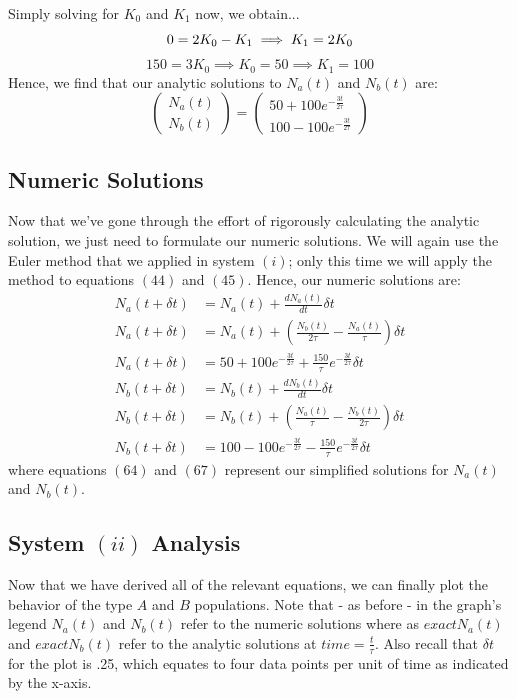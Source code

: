 \documentclass[twocolumn]{article}
\begin{document}
Simply solving for $K_0$ and $K_1$ now, we obtain...
	\begin{equation}
	0=2K_0-K_1 \implies K_1=2K_0\\
	\end{equation}
	\begin{equation}
	150=3K_0 \implies K_0=50 \implies K_1=100
	\end{equation}
Hence, we find that our analytic solutions to $N_a(t)$ and $N_b(t)$ are:
	\begin{equation}
	\left(\begin{array}{c} N_a(t)\\ N_b(t)\end{array}\right) = \left(\begin{array}{c} 50+100e^{-\frac{3t}{2\tau}}\\ 100-100e^{-\frac{3t}{2\tau}}\end{array}\right)
	\end{equation}
\subsection{Numeric Solutions}
\hspace{\parindent} Now that we've gone through the effort of rigorously calculating the analytic solution, we just need to formulate our numeric solutions. We will again use the Euler method that we applied in system $(i)$; only this time we will apply the method to equations $(44)$ and $(45)$. Hence, our numeric solutions are:
	\begin{align}
	N_a(t+\delta t)&=N_a(t)+\frac{dN_a(t)}{dt}\delta t\\
	N_a(t+\delta t)&=N_a(t)+\left(\frac{N_b(t)}{2\tau}-\frac{N_a(t)}{\tau}\right)\delta t\\
	N_a(t+\delta t)&=50+100e^{-\frac{3t}{2\tau}}+\frac{150}{\tau}e^{-\frac{3t}{2\tau}}\delta t\\
	N_b(t+\delta t)&=N_b(t)+\frac{dN_b(t)}{dt}\delta t\\
	N_b(t+\delta t)&=N_b(t)+\left(\frac{N_a(t)}{\tau}-\frac{N_b(t)}{2\tau}\right)\delta t\\
	N_b(t+\delta t)&=100-100e^{-\frac{3t}{2\tau}}-\frac{150}{\tau}e^{-\frac{3t}{2\tau}}\delta t
	\end{align}
where equations $(64)$ and $(67)$ represent our simplified solutions for $N_a(t)$ and $N_b(t)$.
\subsection{System $(ii)$ Analysis}
\hspace{\parindent} Now that we have derived all of the relevant equations, we can finally plot the behavior of the type $A$ and $B$ populations. Note that - as before - in the graph's legend $N_a(t)$ and $N_b(t)$ refer to the numeric solutions where as $exactN_a(t)$ and $exactN_b(t)$ refer to the analytic solutions at $time=\frac{t}{\tau}$. Also recall that $\delta t$ for the plot is .25, which equates to four data points per unit of time as indicated by the x-axis.
\end{document}
